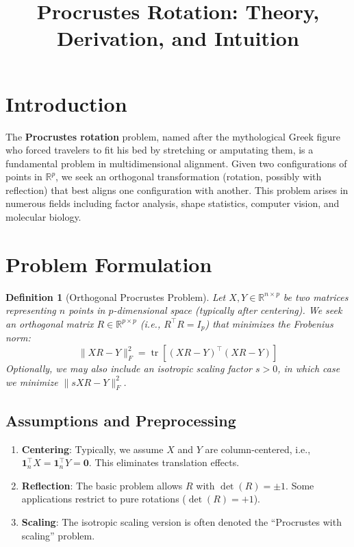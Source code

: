 \documentclass[11pt]{article}
\title{Procrustes Rotation: Theory, Derivation, and Intuition}
\author{}
\date{}
\newtheorem{definition}{Definition}
\begin{document}
\maketitle

\tableofcontents

\section{Introduction}
\label{sec:introduction}

The \textbf{Procrustes rotation} problem, named after the mythological Greek figure who forced travelers to fit his bed by stretching or amputating them, is a fundamental problem in multidimensional alignment. Given two configurations of points in $\mathbb{R}^p$, we seek an orthogonal transformation (rotation, possibly with reflection) that best aligns one configuration with another. This problem arises in numerous fields including factor analysis, shape statistics, computer vision, and molecular biology.

\section{Problem Formulation}
\label{sec:formulation}

\begin{definition}[Orthogonal Procrustes Problem]
Let $X, Y \in \mathbb{R}^{n \times p}$ be two matrices representing $n$ points in $p$-dimensional space (typically after centering). We seek an orthogonal matrix $R \in \mathbb{R}^{p \times p}$ (i.e., $R^\top R = I_p$) that minimizes the Frobenius norm:
\[
\|XR - Y\|_F^2 = \operatorname{tr}\left[(XR - Y)^\top (XR - Y)\right]
\]
Optionally, we may also include an isotropic scaling factor $s > 0$, in which case we minimize $\|sXR - Y\|_F^2$.
\end{definition}

\subsection{Assumptions and Preprocessing}
\label{subsec:preprocessing}

\begin{enumerate}
    \item \textbf{Centering}: Typically, we assume $X$ and $Y$ are column-centered, i.e., $\mathbf{1}_n^\top X = \mathbf{1}_n^\top Y = \mathbf{0}$. This eliminates translation effects.
    \item \textbf{Reflection}: The basic problem allows $R$ with $\det(R) = \pm 1$. Some applications restrict to pure rotations ($\det(R) = +1$).
    \item \textbf{Scaling}: The isotropic scaling version is often denoted the ``Procrustes with scaling'' problem.
\end{enumerate}
\end{document}

